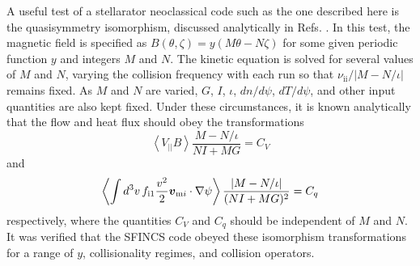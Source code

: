\documentclass[12pt]{revtex4}
\newcommand{\vect}[1]{\mbox{\boldmath $#1$}}
\newcommand{\nuii}{\nu_{\mathrm{ii}}}
\begin{document}
A useful test of a stellarator neoclassical code such as the one
described here is the quasisymmetry isomorphism,
discussed analytically in Refs. \cite{Pytte, Boozer83, meQS}.
In this test, the magnetic field is specified as $B(\theta,\zeta) = y(M\theta-N\zeta)$
for some given periodic function $y$ and integers $M$ and $N$.
The kinetic equation is solved for several values of $M$ and $N$,
varying the collision frequency with each run so that
$\nuii / \left|M - N/\iota \right|$ remains fixed.
As $M$ and $N$ are varied, $G$, $I$, $\iota$, $dn/d\psi$, $dT/d\psi$, and other input quantities are also kept fixed.
Under these circumstances, it is known analytically \cite{Pytte, Boozer83, meQS} that the flow
and heat flux should obey the transformations
\begin{equation}
\left< V_{||} B \right> \frac{M-N/\iota}{NI+MG} = C_V
\end{equation}
and
\begin{equation}
\left< \int d^3v\, f_{\mathrm{i}1} \frac{v^2}{2}\vect{v}_{\mathrm{m}i}\cdot\nabla\psi \right> \frac{\left| M-N/\iota\right| }{(NI+MG)^2} = C_q
\end{equation}
respectively, where the quantities $C_V$ and $C_q$ should be independent of $M$ and $N$.
It was verified that the SFINCS code obeyed these isomorphism transformations
for a range of $y$, collisionality regimes, and collision operators.


\end{document}

